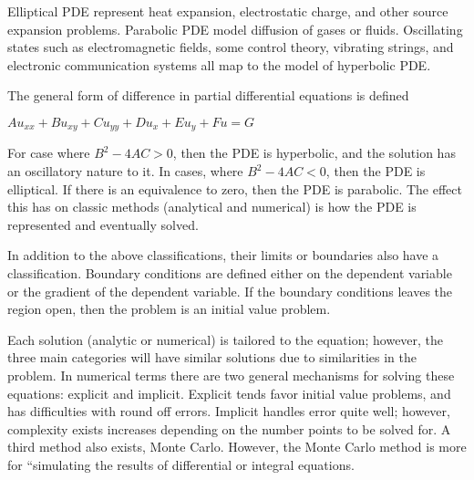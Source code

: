 Elliptical PDE represent %
heat expansion, electrostatic charge, and other source expansion problems.  Parabolic PDE model diffusion of gases or fluids.  Oscillating states such as electromagnetic fields, some control theory, vibrating strings, and electronic communication systems all map to the model of hyperbolic PDE.%

The general form of difference in partial differential equations is defined %

$Au_{xx} + Bu_{xy} +Cu_{yy} +Du_{x} + Eu_{y} + Fu = G$

For case where $B^2 - 4AC > 0 $, then the PDE is hyperbolic, and the solution has an oscillatory nature to it.  In cases, where  $B^2 - 4AC < 0 $,  then the PDE is elliptical.  If there is an equivalence to zero, then the PDE is parabolic.  The effect this has on classic methods (analytical and numerical) is how the PDE is represented and eventually solved.  


In addition to the above classifications, %
their limits or boundaries also have a classification.   Boundary conditions are defined either on the dependent variable or the gradient of the dependent variable.  If the boundary conditions leaves the region open, then the problem is an initial value problem.   %



Each solution (analytic or numerical) is tailored to the equation; however, the three main categories will have similar solutions due to similarities in the problem.
In numerical terms there are two general mechanisms for solving these equations: explicit and implicit.  Explicit tends favor initial value problems, and has difficulties with round off errors.  Implicit handles error quite well; however, complexity exists increases depending on the number points to be solved for.  A third method also exists, Monte Carlo.  However, the Monte Carlo method is more for ``simulating the results of differential or integral equations.  




